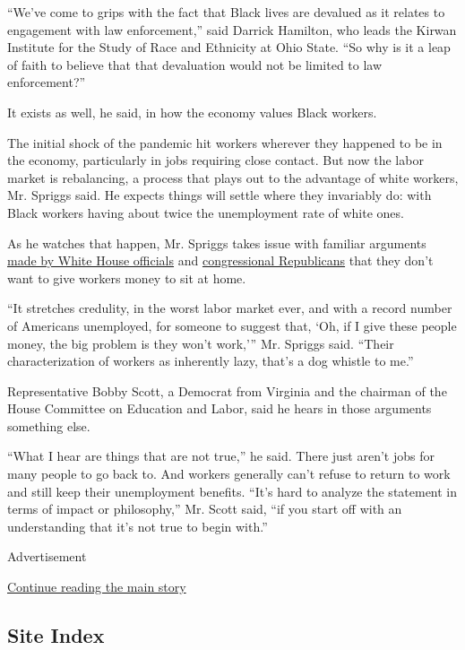 ``We've come to grips with the fact that Black lives are devalued as it
relates to engagement with law enforcement,'' said Darrick Hamilton, who
leads the Kirwan Institute for the Study of Race and Ethnicity at Ohio
State. ``So why is it a leap of faith to believe that that devaluation
would not be limited to law enforcement?''

It exists as well, he said, in how the economy values Black workers.

The initial shock of the pandemic hit workers wherever they happened to
be in the economy, particularly in jobs requiring close contact. But now
the labor market is rebalancing, a process that plays out to the
advantage of white workers, Mr. Spriggs said. He expects things will
settle where they invariably do: with Black workers having about twice
the unemployment rate of white ones.

As he watches that happen, Mr. Spriggs takes issue with familiar
arguments
\href{https://thehill.com/homenews/sunday-talk-shows/510172-mnuchin-on-600-unemployment-benefit-we-cant-be-paying-people-more}{made
by White House officials} and
\href{https://www.nbcnews.com/politics/congress/600-federal-unemployment-benefit-ends-month-gop-senators-say-enough-n1232588}{congressional
Republicans} that they don't want to give workers money to sit at home.

``It stretches credulity, in the worst labor market ever, and with a
record number of Americans unemployed, for someone to suggest that, `Oh,
if I give these people money, the big problem is they won't work,''' Mr.
Spriggs said. ``Their characterization of workers as inherently lazy,
that's a dog whistle to me.''

Representative Bobby Scott, a Democrat from Virginia and the chairman of
the House Committee on Education and Labor, said he hears in those
arguments something else.

``What I hear are things that are not true,'' he said. There just aren't
jobs for many people to go back to. And workers generally can't refuse
to return to work and still keep their unemployment benefits. ``It's
hard to analyze the statement in terms of impact or philosophy,'' Mr.
Scott said, ``if you start off with an understanding that it's not true
to begin with.''

Advertisement

\protect\hyperlink{after-bottom}{Continue reading the main story}

\hypertarget{site-index}{%
\subsection{Site Index}\label{site-index}}

